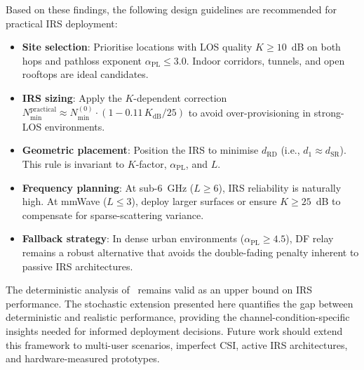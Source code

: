\documentclass[journal]{IEEEtran} %
\begin{document}
Based on these findings, the following design guidelines are recommended for practical IRS deployment:

\begin{itemize}[leftmargin=*]
    \item \textbf{Site selection}: Prioritise locations with LOS quality $K \geq 10$~dB on both hops and pathloss exponent $\alpha_{\mathrm{PL}} \leq 3.0$. Indoor corridors, tunnels, and open rooftops are ideal candidates.

    \item \textbf{IRS sizing}: Apply the $K$-dependent correction $N_{\mathrm{min}}^{\mathrm{practical}} \approx N_{\mathrm{min}}^{(0)} \cdot (1 - 0.11\,K_{\mathrm{dB}}/25)$ to avoid over-provisioning in strong-LOS environments.

    \item \textbf{Geometric placement}: Position the IRS to minimise $d_{\mathrm{RD}}$ (i.e., $d_1 \approx d_{\mathrm{SR}}$). This rule is invariant to $K$-factor, $\alpha_{\mathrm{PL}}$, and $L$.

    \item \textbf{Frequency planning}: At sub-6~GHz ($L \geq 6$), IRS reliability is naturally high. At mmWave ($L \leq 3$), deploy larger surfaces or ensure $K \geq 25$~dB to compensate for sparse-scattering variance.

    \item \textbf{Fallback strategy}: In dense urban environments ($\alpha_{\mathrm{PL}} \geq 4.5$), DF relay remains a robust alternative that avoids the double-fading penalty inherent to passive IRS architectures.
\end{itemize}

The deterministic analysis of~\cite{bjornson2020irs} remains valid as an upper bound on IRS performance. The stochastic extension presented here quantifies the gap between deterministic and realistic performance, providing the channel-condition-specific insights needed for informed deployment decisions. Future work should extend this framework to multi-user scenarios, imperfect CSI, active IRS architectures, and hardware-measured prototypes.




\end{document}
